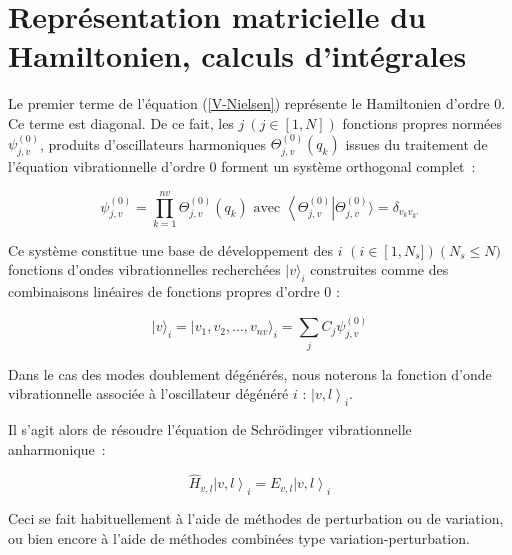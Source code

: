   




\section[Représentation matricielle du Hamiltonien]{Représentation matricielle du Hamiltonien, calculs d'intégrales}

Le premier terme de l'équation (\ref{V-Nielsen}) représente le Hamiltonien d'ordre 0. Ce terme est diagonal. De ce fait, les $j \ \left(j\in\left[1,N\right]\right)$ fonctions propres normées $\psi^{(0)}_{j,v}$, produits  d'oscillateurs harmoniques $\Theta^{(0)}_{j,v}(q_k)$ issues du traitement de l'équation vibrationnelle d'ordre 0 forment un système orthogonal complet~:

\begin{equation}
\psi^{(0)}_{j,v} = \prod^{nv}_{k=1} \Theta^{(0)}_{j,v}(q_k) \text{ avec } \left\langle \Theta^{(0)}_{j,v} \right| \Theta^{(0)}_{j,v} \rangle = \delta_{v_k v_{k'}}
\end{equation}

Ce système constitue une base de développement des $i$ $\left(i\in\left[1, N_s\right.]\right) \left(N_s\leq N\right.)$ fonctions d'ondes vibrationnelles recherchées $\left.|v\right.\rangle_i$ construites comme des combinaisons linéaires de fonctions propres d'ordre 0 :

\begin{equation}
\left.|v\right.\rangle_i = \left.|v_1, v_2, \ldots, v_{nv}\right.\rangle_i = \sum_j C_j \psi^{(0)}_{j,v}
\end{equation}

Dans le cas des modes doublement dégénérés, nous noterons la fonction d'onde vibrationnelle associée à l'oscillateur dégénéré $i$ : $\left.\left.\right|v,l\right\rangle_i$.

Il s'agit alors de résoudre l'équation de Schr\"{o}dinger vibrationnelle anharmonique~:

\begin{equation} \label{Eq-Schrod-anhar}
	\hat{H}_{v,l} \left.\left.\right|v,l\right\rangle_i = E_{v,l} \left.\left.\right|v,l\right\rangle_i
\end{equation}

Ceci se fait habituellement à l'aide de méthodes de perturbation ou de variation, ou bien encore à l'aide de méthodes combinées type variation-perturbation.

